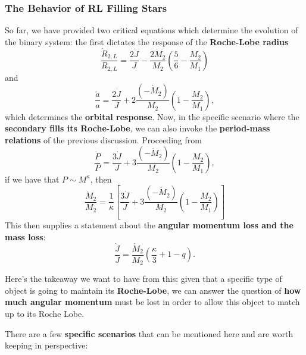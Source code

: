 \subsubsection{The Behavior of RL Filling Stars}
So far, we have provided two critical equations which determine the evolution of the binary system: the first dictates the response of the \textbf{Roche-Lobe radius}
\begin{equation}
        \frac{\dot{R}_{2,L}}{R_{2,L}} = \frac{2\dot{J}}{J} - \frac{2\dot{M}_2}{M_2}\left(\frac{5}{6}-\frac{M_2}{M_1}\right)
\end{equation}
and
\[
\frac{\dot{a}}{a} = \frac{2\dot{J}}{J}
    + 2\frac{(-\dot{M}_2)}{M_2}\left(1 - \frac{M_2}{M_1}\right),
\]
which determines the \textbf{orbital response}. Now, in the specific scenario where the \textbf{secondary fills its Roche-Lobe}, we can also invoke the \textbf{period-mass relations} of the previous discussion. Proceeding from 
\[
\frac{\dot{P}}{P} = \frac{3\dot{J}}{J}
    + 3\frac{(-\dot{M}_2)}{M_2}\left(1 - \frac{M_2}{M_1}\right),
\]
if we have that $P \sim M^\kappa$, then
\[
\frac{\dot{M}_2}{M_2} = \frac{1}{\kappa}\left[\frac{3\dot{J}}{J}+ 3\frac{(-\dot{M}_2)}{M_2}\left(1 - \frac{M_2}{M_1}\right)\right]
\]
This then supplies a statement about the \textbf{angular momentum loss and the mass loss}:
\[
\frac{\dot{J}}{J} = \frac{\dot{M}_2}{M_2} \left(\frac{\kappa}{3} + 1 - q\right).
\]
\begin{bigidea}
    Here's the takeaway we want to have from this: given that a specific type of object is going to maintain its \textbf{Roche-Lobe}, we can answer the question
    of \textbf{how much angular momentum} must be lost in order to allow this object to match up to its Roche Lobe.
\end{bigidea}
There are a few \textbf{specific scenarios} that can be mentioned here and are worth keeping in perspective:
